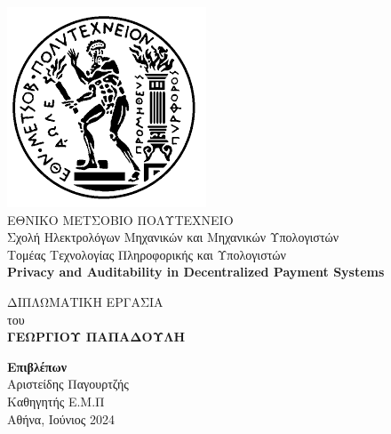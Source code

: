 \begin{titlepage}
    \slg
    \begin{center}
        \includegraphics[scale=0.5]{images/ntua.png} \\  
        \vspace*{0.8cm}
        \large
        ΕΘΝΙΚΟ ΜΕΤΣΟΒΙΟ ΠΟΛΥΤΕΧΝΕΙΟ\\
        \normalsize
        Σχολή Ηλεκτρολόγων Μηχανικών και Μηχανικών Υπολογιστών\\
        Τομέας Τεχνολογίας Πληροφορικής και Υπολογιστών\\
        \vspace{1.5cm} 
        \Large
        \sle
        \textbf{Privacy and Auditability in Decentralized Payment Systems}
            
        \vspace{0.5cm}
        
            
        \vspace{1cm}
        \slg
        \normalsize
        ΔΙΠΛΩΜΑΤΙΚΗ ΕΡΓΑΣΙΑ\\
        \vspace*{0.35cm}
        \normalsize
        του\\
        \vspace*{0.35cm}
        \normalsize
        \textbf{ΓΕΩΡΓΙΟΥ ΠΑΠΑΔΟΥΛΗ}
            
        
            
        
            
        \vspace{3.5cm}
            
        \normalsize
        \textbf{Επιβλέπων}\\
        Αριστείδης Παγουρτζής\\
        Καθηγητής Ε.Μ.Π\\
        
        \vfill
        \normalsize
        Αθήνα, Ιούνιος 2024
            
    \end{center}
\end{titlepage}